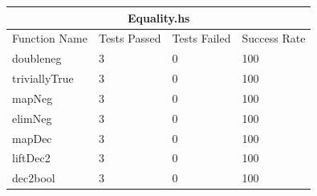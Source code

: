 \documentclass[12pt, svgnames]{article}
\begin{document}
\begin{adjustwidth}{-0.5cm}{}    
    \begin{tabular}[h!]{ |p{5cm}||p{3cm}|p{3cm}|p{3cm}|  }
        
        \hline
        \multicolumn{4}{|c|}{Equality.hs} \\
        \hline
        Function Name & Tests Passed & Tests Failed & Success Rate\\
        \hline
        doubleneg   & 3    &0&   100\\
        triviallyTrue &   3  & 0   &100\\
        mapNeg & 3 & 0&  100\\
        elimNeg & 3 & 0&  100\\
        mapDec  &   3  & 0&100\\
        liftDec2 & 3  & 0   &100\\
        dec2bool & 3  & 0& 100\\
        \hline
    \end{tabular}
\end{adjustwidth}
\end{document}
